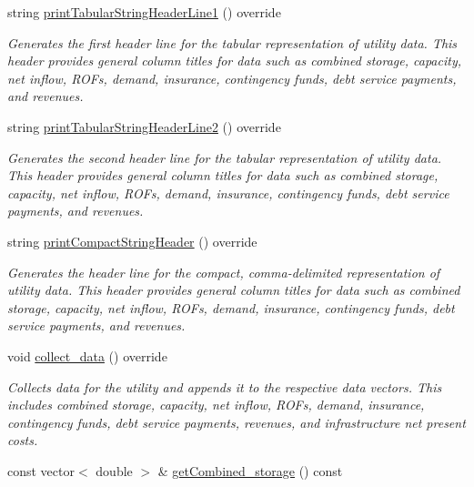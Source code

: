 \begin{DoxyCompactItemize}
string \mbox{\hyperlink{classUtilitiesDataCollector_a796aa9d7637d8ed04dbd949ca2a34088}{print\+Tabular\+String\+Header\+Line1}} () override
\begin{DoxyCompactList}\small\item\em Generates the first header line for the tabular representation of utility data. This header provides general column titles for data such as combined storage, capacity, net inflow, R\+O\+Fs, demand, insurance, contingency funds, debt service payments, and revenues. \end{DoxyCompactList}\item 
string \mbox{\hyperlink{classUtilitiesDataCollector_ae502a096e8f4fdfdfd481ab2093f9771}{print\+Tabular\+String\+Header\+Line2}} () override
\begin{DoxyCompactList}\small\item\em Generates the second header line for the tabular representation of utility data. This header provides general column titles for data such as combined storage, capacity, net inflow, R\+O\+Fs, demand, insurance, contingency funds, debt service payments, and revenues. \end{DoxyCompactList}\item 
string \mbox{\hyperlink{classUtilitiesDataCollector_ab3409c407783fd4451f310d2fc177b22}{print\+Compact\+String\+Header}} () override
\begin{DoxyCompactList}\small\item\em Generates the header line for the compact, comma-\/delimited representation of utility data. This header provides general column titles for data such as combined storage, capacity, net inflow, R\+O\+Fs, demand, insurance, contingency funds, debt service payments, and revenues. \end{DoxyCompactList}\item 
void \mbox{\hyperlink{classUtilitiesDataCollector_ab72c4432d6816beb1f4f4b354fb3023d}{collect\+\_\+data}} () override
\begin{DoxyCompactList}\small\item\em Collects data for the utility and appends it to the respective data vectors. This includes combined storage, capacity, net inflow, R\+O\+Fs, demand, insurance, contingency funds, debt service payments, revenues, and infrastructure net present costs. \end{DoxyCompactList}\item 
const vector$<$ double $>$ \& \mbox{\hyperlink{classUtilitiesDataCollector_a9d1478c486b9be64fa452b34258e8b03}{get\+Combined\+\_\+storage}} () const

\end{DoxyCompactItemize}
